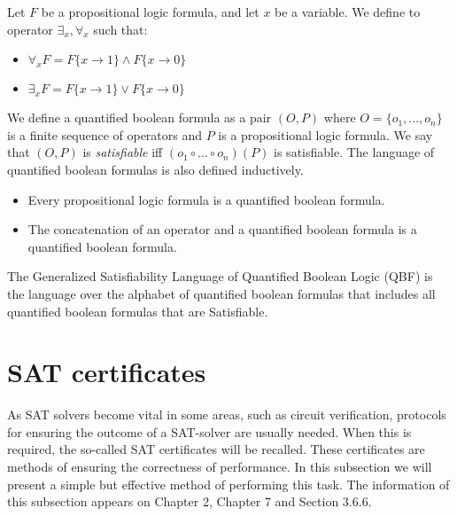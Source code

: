 \begin{definition}
  Let $F$ be a propositional logic formula, and let $x$ be a variable. We define to operator $\exists_x, \forall_x$ such that:
  \begin{itemize}
  \item $\forall_x F = F\{x \to 1\} \land F\{x \to 0\}$
  \item $\exists_x F = F\{x \to 1\} \lor F\{x \to 0\}$
  \end{itemize}

  We define a quantified boolean formula as a pair $(O,P)$ where $O=\{o_1,...,o_n\}$ is a finite sequence of operators and $P$ is a propositional logic formula. We say that $(O,P)$ is \emph{satisfiable} iff $(o_1\circ ...\circ o_n) (P)$ is satisfiable. The language of quantified boolean formulas is also defined inductively.
  \begin{itemize}
  \item Every propositional logic formula is a quantified boolean formula.
  \item The concatenation of an operator and a quantified boolean formula is a quantified boolean formula.
  \end{itemize}
\end{definition}


\begin{definition}
  The Generalized Satisfiability Language of Quantified Boolean Logic (QBF) is the language over the alphabet of quantified boolean formulas that includes all quantified boolean formulas that are Satisfiable.
\end{definition}








\section{SAT certificates}

As SAT solvers become vital in some areas, such as circuit verification, protocols for ensuring the outcome of a SAT-solver are usually needed. When this is required, the so-called SAT certificates will be recalled. These certificates are methods of ensuring the correctness of performance. In this subsection we will present a simple but effective method of performing this task. The information of this subsection appears on Chapter 2\cite{schoning2013satisfiability}, Chapter 7\cite{marek2009introduction} and Section 3.6.6\cite{darwiche2009complete}.\\


